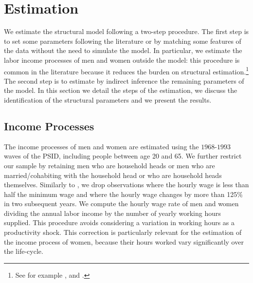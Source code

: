 \documentclass[12pt]{article}
\numberwithin{table}{section}
\begin{document}
\section{Estimation}
We estimate the structural model following a two-step procedure. The first step is to set some parameters following the literature or by matching some features of the data without the need to simulate the model. In particular, we estimate the labor income processes of men and women outside the model: this procedure is common in the literature because it reduces the burden on structural estimation.\footnote{See for example \cite{voena2015}, \cite{reynoso2019} and \cite{gourinchas2002}.}
The second step is to estimate by indirect inference the remaining parameters of the model. In this section we detail the steps of the estimation, we discuss the identification of the structural parameters and we present the results.
\subsection{Income Processes}
The income processes of men and women are estimated using the $1968$-$1993$ waves of the PSID, including people between age 20 and 65. We further restrict our sample by retaining men who are household heads or men who are married/cohabiting with the household head or who are household heads themselves. Similarly to \cite{low2018}, we drop observations where the hourly wage is less than half the minimum wage and where the hourly wage changes by more than 125\% in two subsequent years.  We compute the hourly wage rate of men and women dividing the annual labor income by the number of yearly working hours supplied. This procedure avoids considering a variation in working hours as a productivity shock. This correction is particularly relevant for the estimation of the income process of women, because their hours worked vary significantly over the life-cycle. 
\end{document}
